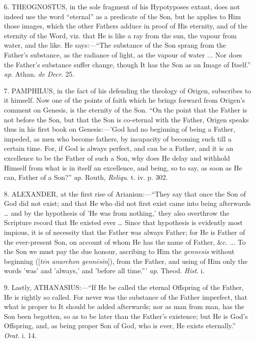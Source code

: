 6. THEOGNOSTUS, in the sole fragment of his
Hypotyposes extant, does not indeed use the word ``eternal''
as a predicate of the Son, but he applies to Him those images, which
the other Fathers adduce in proof of His eternity, and of the eternity
of the Word, viz. that He is like a ray from the sun, the vapour from
water, and the like. He says:—``The substance of the Son sprang
from the Father's substance, as the radiance of light, as the vapour
of water ... Nor does the Father's substance suffer change, though It
has the Son as an Image of Itself.'' \emph{ap}. Athan. \emph{de Decr}.
25.

7. PAMPHILUS, in the fact of his defending
the theology of Origen, subscribes to it himself. Now one of the
points of faith which he brings forward from Origen's comment on
Genesis, is the eternity of the Son. ``On the point that the
Father is not before the Son, but that the Son is co-eternal with the
Father, Origen speaks thus in his first book on Genesis:—'God had no
beginning of being a Father, impeded, as men who become fathers, by
incapacity of becoming such till a certain time. For, if God is always
perfect, and can be a Father, and it is an excellence to be the Father
of such a Son, why does He delay and withhold Himself from what
is in itself an excellence, and being, so to say, as soon as He can,
Father of a Son?'' \emph{ap}. Routh, \emph{Reliqu}. t. iv. p. 302.

8. ALEXANDER, at the first rise of Arianism:—``They
say that once the Son of God did not exist; and that He who did not
first exist came into being afterwards … and by the hypothesis of
'He was from nothing,' they also overthrow the Scripture record that
He existed ever … Since that hypothesis is evidently most impious,
it is of necessity that the Father was always Father; for He is Father
of the ever-present Son, on account of whom He has the name of Father,
\&c. ... To the Son we must pay the due honour, ascribing to Him
the \emph{gennesis} without beginning ([\emph{t\={e}n anarchon genn\={e}sin}]),
from the Father, and using of Him only the words 'was' and 'always,'
and 'before all time.''' \emph{ap}. Theod. \emph{Hist}. i.

9. Lastly, ATHANASIUS:—``If He be
called the eternal Offspring of the Father, He is rightly so called.
For never was the substance of the Father imperfect, that what is
proper to It should be added afterwards; nor as man from man, has the
Son been begotten, so as to be later than the Father's existence; but
He is God's Offspring, and, as being proper Son of God, who is ever,
He exists eternally.'' \emph{Orat}. i. 14.

